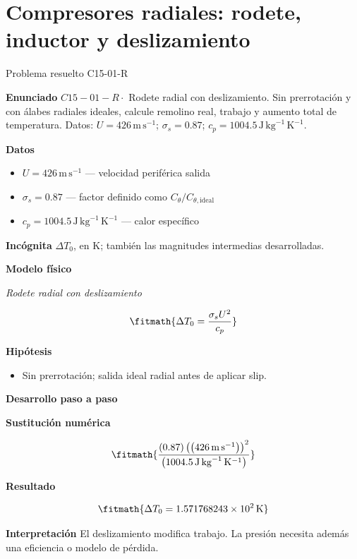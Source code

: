 \documentclass[10pt,openany]{book}
\begin{document}
\chapter{Compresores radiales: rodete, inductor y deslizamiento}
\begin{studiumworked}{Problema resuelto C15-01-R}


\noindent\textbf{Enunciado}
\(C15-01-R \cdot\) Rodete radial con deslizamiento. Sin prerrotación y con álabes radiales ideales, calcule remolino real, trabajo y aumento total de temperatura. Datos: \(U=426\, \mathrm{m}\,\mathrm{s}^{-1}\); \(\sigma_s=0.87\); \(c_p=1004.5\, \mathrm{J}\,\mathrm{kg}^{-1}\,\mathrm{K}^{-1}\).

\noindent\textbf{Datos}
\begin{itemize}
\item $U = 426\,\mathrm{m}\,\mathrm{s}^{-1}$ — velocidad periférica salida
\item $\sigma_s = 0.87$ — factor definido como $C_\theta/C_{\theta,\mathrm{ideal}}$
\item $c_p = 1004.5\,\mathrm{J}\,\mathrm{kg}^{-1}\,\mathrm{K}^{-1}$ — calor específico
\end{itemize}

\noindent\textbf{Incógnita}
$\Delta T_0$, en $\mathrm{K}$; también las magnitudes intermedias desarrolladas.

\noindent\textbf{Modelo físico}

\noindent\textit{Rodete radial con deslizamiento}

\[
\fitmath{\Delta T_0=\frac{\sigma_s U^{2}}{c_p}}
\]

\noindent\textbf{Hipótesis}
\begin{itemize}
\item Sin prerrotación; salida ideal radial antes de aplicar slip.
\end{itemize}

\noindent\textbf{Desarrollo paso a paso}



\noindent\textbf{Sustitución numérica}

\[
\fitmath{\frac{\left(0.87\right) \left(\left(426\,\mathrm{m}\,\mathrm{s}^{-1}\right)\right)^{2}}{\left(1004.5\,\mathrm{J}\,\mathrm{kg}^{-1}\,\mathrm{K}^{-1}\right)}}
\]

\noindent\textbf{Resultado}

\[
\fitmath{\Delta T_0=1.571768243\times10^{2}\,\mathrm{K}}
\]

\noindent\textbf{Interpretación}
El deslizamiento modifica trabajo. La presión necesita además una eficiencia o modelo de pérdida.


\end{studiumworked}
\end{document}
